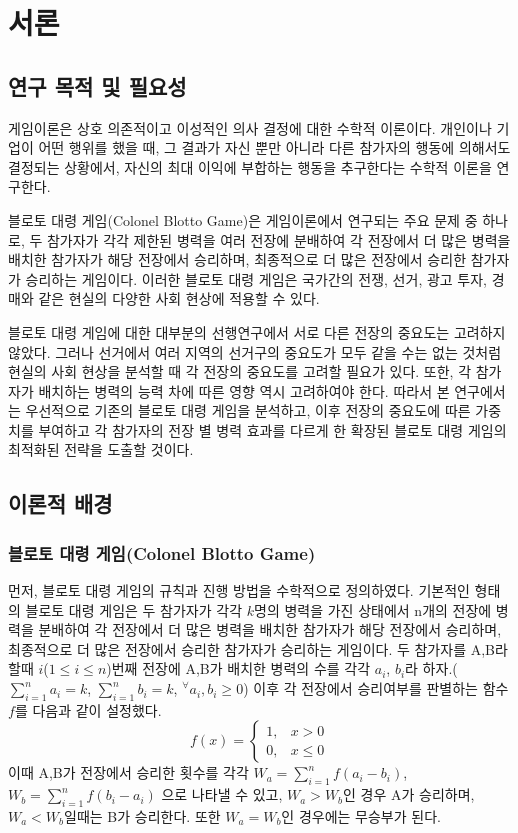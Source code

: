\section{서론}
\subsection{연구 목적 및 필요성}
게임이론은 상호 의존적이고 이성적인 의사 결정에 대한 수학적 이론이다. 개인이나 기업이 어떤 행위를 했을 때, 그 결과가 자신 뿐만 아니라 다른 참가자의 행동에 의해서도 결정되는 상황에서, 자신의 최대 이익에 부합하는 행동을 추구한다는 수학적 이론을 연구한다.

블로토 대령 게임(Colonel Blotto Game)은 게임이론에서 연구되는 주요 문제 중 하나로, 두 참가자가 각각 제한된 병력을 여러 전장에 분배하여 각 전장에서 더 많은 병력을 배치한 참가자가 해당 전장에서 승리하며, 최종적으로 더 많은 전장에서 승리한 참가자가 승리하는 게임이다. 이러한 블로토 대령 게임은 국가간의 전쟁, 선거, 광고 투자, 경매와 같은 현실의 다양한 사회 현상에 적용할 수 있다. \cite{behnezhad2018battlefields}

블로토 대령 게임에 대한 대부분의 선행연구에서 서로 다른 전장의 중요도는 고려하지 않았다. 그러나 선거에서 여러 지역의 선거구의 중요도가 모두 같을 수는 없는 것처럼 현실의 사회 현상을 분석할 때 각 전장의 중요도를 고려할 필요가 있다. 또한, 각 참가자가 배치하는 병력의 능력 차에 따른 영향 역시 고려하여야 한다. 따라서 본 연구에서는 우선적으로 기존의 블로토 대령 게임을 분석하고, 이후 전장의 중요도에 따른 가중치를 부여하고 각 참가자의 전장 별 병력 효과를 다르게 한 확장된 블로토 대령 게임의 최적화된 전략을 도출할 것이다.

\subsection{이론적 배경}
\subsubsection{블로토 대령 게임(Colonel Blotto Game)}
먼저, 블로토 대령 게임의 규칙과 진행 방법을 수학적으로 정의하였다. 기본적인 형태의 블로토 대령 게임은 두 참가자가 각각 $k$명의 병력을 가진 상태에서 n개의 전장에 병력을 분배하여 각 전장에서 더 많은 병력을 배치한 참가자가 해당 전장에서 승리하며, 최종적으로 더 많은 전장에서 승리한 참가자가 승리하는 게임이다. 두 참가자를 A,B라 할때 $i$($1\le i\le n$)번째 전장에 A,B가 배치한 병력의 수를 각각 $a_i$, $b_i$라 하자.($\sum\limits_{i=1}^n a_i=k$, $\sum\limits_{i=1}^n b_i=k$, ${}_{}^{\forall}a_i, b_i \ge 0$)
이후 각 전장에서 승리여부를 판별하는 함수 $f$를 다음과 같이 설정했다.
$$f(x)=\begin{cases}
1, & x>0 \\
0, & x\le 0
\end{cases}$$
이때 A,B가 전장에서 승리한 횟수를 각각 $W_a=\sum\limits_{i=1}^n f(a_i-b_i)$, $W_b=\sum\limits_{i=1}^n f(b_i-a_i)$ 으로 나타낼 수 있고, $W_a>W_b$인 경우 A가 승리하며, $W_a<W_b$일때는 B가 승리한다. 또한 $W_a=W_b$인 경우에는 무승부가 된다.
